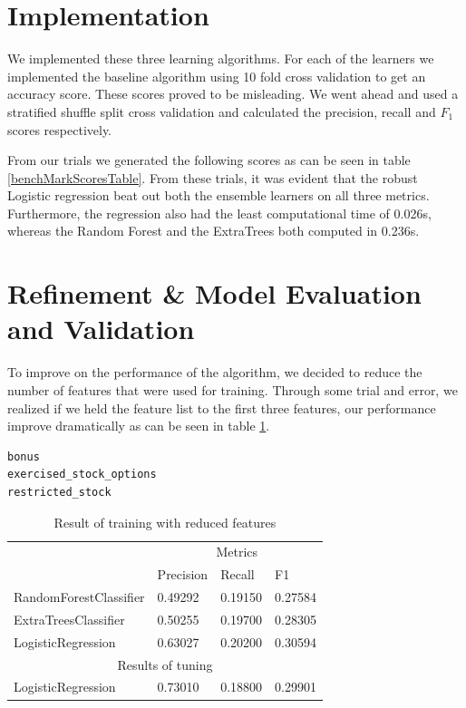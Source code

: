 \documentclass[twoside,openright,titlepage,numbers=noenddot,headinclude,%
               footinclude=true,cleardoublepage=empty,abstractoff,BCOR=5mm,%
               paper=a4,fontsize=11pt,ngerman,american]{scrreprt}
\numberwithin{theorem}{chapter}
\numberwithin{definition}{chapter}
\numberwithin{algorithm}{chapter}
\numberwithin{figure}{chapter}
\numberwithin{table}{chapter}
\numberwithin{equation}{chapter}
\begin{document}
\section*{Implementation}

We implemented these three learning algorithms. For each of the learners we implemented the baseline algorithm using 10 fold cross validation to get an accuracy score. These scores proved to be misleading. We went ahead and used a stratified shuffle split cross validation and calculated the precision, recall and $F_1$ scores respectively.

From our trials we generated the following scores as can be seen in table \ref{benchMarkScoresTable}. From these trials, it was evident that the robust Logistic regression beat out both the ensemble learners on all three metrics. Furthermore, the regression also had the least computational time of 0.026s, whereas the Random Forest and the ExtraTrees both computed in 0.236s.


\section*{Refinement \& Model Evaluation and Validation}
To improve on the performance of the algorithm, we decided to reduce the number of features that were used for training. Through some trial and error, we realized if we held the feature list to the first three features, our performance improve dramatically as can be seen in table \ref{reducedFeaturesTable}.
\begin{verbatim}
bonus
exercised_stock_options
restricted_stock 
\end{verbatim}

\setlength{\extrarowheight}{1.5pt}
\begin{table}[!htbp]
\caption{Result of training with reduced features} %
\centering %
\begin{tabular}{|p{6cm}|p{1.5cm}|p{1.5cm}|p{1.5cm}|} %
\hline %
& \multicolumn{3}{c|}{Metrics}\\[5pt]
\cline{2-4} 
& Precision & Recall & F1\\[0.5ex]
\hline %

RandomForestClassifier      &  0.49292  &0.19150 &0.27584\\ 
ExtraTreesClassifier        &  0.50255  &0.19700 &0.28305\\ 
LogisticRegression          &  0.63027  &0.20200 &0.30594\\ 
\hline%
\multicolumn{4}{|c|}{Results of tuning}\\[5pt]
\hline

LogisticRegression          &  0.73010  &0.18800  &0.29901\\ 
\hline
\end{tabular}
\label{reducedFeaturesTable}
\end{table}
\end{document}
